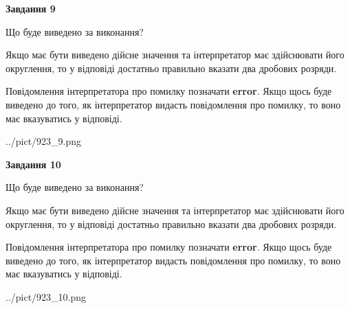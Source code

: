 \documentclass[12pt, ukrainian]{article}
\begin{document}
{\begin {Large}
{\begin {center}\textbf{Завдання 9}\end {center}}\par
Що буде виведено за виконання? \par

Якщо має бути виведено дійсне значення та інтерпретатор має здійснювати його округлення, 
то у відповіді достатньо правильно вказати два дробових розряди.

Повідомлення інтерпретатора про помилку позначати \textbf{error}.
Якщо щось буде виведено до того, як інтерпретатор видасть повідомлення про помилку, 
то воно має вказуватись у відповіді. \par

\begin{center}
	{../pict/923_9.png}
\end{center}
\newpage

{\begin {center}\textbf{Завдання 10}\end {center}}\par
Що буде виведено за виконання? \par

Якщо має бути виведено дійсне значення та інтерпретатор має здійснювати його округлення, 
то у відповіді достатньо правильно вказати два дробових розряди.

Повідомлення інтерпретатора про помилку позначати \textbf{error}.
Якщо щось буде виведено до того, як інтерпретатор видасть повідомлення про помилку, 
то воно має вказуватись у відповіді. \par

\begin{center}
	{../pict/923_10.png}
\end{center}
\newpage

\end {Large}}
\end{document}
